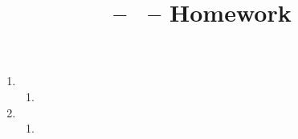 \documentclass[11pt]{article}
\title{\CourseName -- \CourseSemester\ \CourseYear -- Homework \HWnum}
\author{\Name}
\begin{document}
\maketitle

\begin{enumerate}

\item
\begin{enumerate}
\item
\end{enumerate}

\item
\begin{enumerate}
\item
\end{enumerate}

\end{enumerate}
\end{document}
